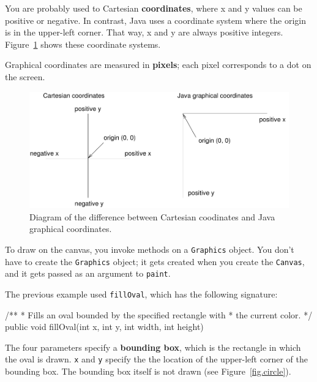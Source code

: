 \documentclass[12pt]{book}
\theoremstyle{exercise}
\newcommand{\java}[1]{\verb"#1"}
\begin{document}
You are probably used to Cartesian {\bf coordinates}, where x and y values can be positive or negative.
In contrast, Java uses a coordinate system where the origin is in the upper-left corner.
That way, x and y are always positive integers.
Figure~\ref{fig.coordinates} shows these coordinate systems.

Graphical coordinates are measured in {\bf pixels}; each pixel corresponds to a dot on the screen.

\begin{figure}
\begin{center}
\includegraphics[width=5in]{figs/coordinates.pdf}
\caption{Diagram of the difference between Cartesian coodinates and Java graphical coordinates.}
\label{fig.coordinates}
\end{center}
\end{figure}

To draw on the canvas, you invoke methods on a \java{Graphics} object.
You don't have to create the \java{Graphics} object; it gets created when you create the \java{Canvas}, and it gets passed as an argument to \java{paint}.

The previous example used \java{fillOval}, which has the following signature:

\begin{code}
    /**
     * Fills an oval bounded by the specified rectangle with
     * the current color.
     */
    public void fillOval(int x, int y, int width, int height)
\end{code}


The four parameters specify a {\bf bounding box}, which is the rectangle in which the oval is drawn.
\java{x} and \java{y} specify the the location of the upper-left corner of the bounding box.
The bounding box itself is not drawn (see Figure~\ref{fig.circle}).
\end{document}
